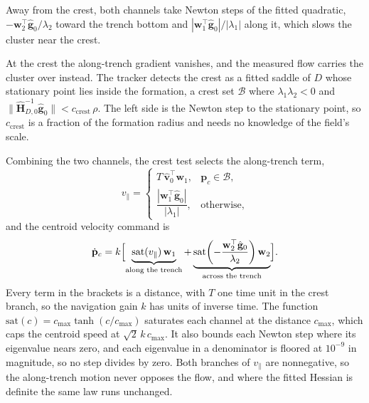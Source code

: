 \documentclass[lettersize,journal]{IEEEtran}
\begin{document}
Away from the crest, both channels take Newton steps of the fitted
quadratic, $-\mathbf{w}_2^\top\hat{\mathbf{g}}_0/\lambda_2$ toward the
trench bottom and $|\mathbf{w}_1^\top\hat{\mathbf{g}}_0|/|\lambda_1|$
along it, which slows the cluster near the crest.

At the crest the along-trench gradient vanishes, and the measured flow
carries the cluster over instead. The tracker detects the crest as a
fitted saddle of $D$ whose stationary point lies inside the formation, a
crest set $\mathcal{B}$ where $\lambda_1\lambda_2 < 0$ and
\mbox{$\|\hat{\mathbf{H}}_{D,0}^{-1}\hat{\mathbf{g}}_0\| < c_{\mathrm{crest}}\,\rho$}.
The left side is the Newton step to the stationary point, so
$c_{\mathrm{crest}}$ is a fraction of the formation radius and needs no
knowledge of the field's scale.

Combining the two channels, the crest test selects the along-trench term,
\begin{equation}
    v_\parallel =
    \begin{cases}
        T\,\hat{\mathbf{v}}_0^\top \mathbf{w}_1,
            & \mathbf{p}_c \in \mathcal{B}, \\[6pt]
        \dfrac{|\mathbf{w}_1^\top \hat{\mathbf{g}}_0|}{|\lambda_1|},
            & \text{otherwise},
    \end{cases}
    \label{eq:vpar}
\end{equation}
and the centroid velocity command is
\begin{equation}
    \dot{\mathbf{p}}_c = k\Bigl[
    \underbrace{\mathrm{sat}(v_\parallel)\,\mathbf{w}_1}_{\text{along the trench}}
    + \underbrace{\mathrm{sat}\!\left(-\frac{\mathbf{w}_2^\top
      \hat{\mathbf{g}}_0}{\lambda_2}\right)\mathbf{w}_2}_{\text{across the trench}}\Bigr].
    \label{eq:d_law}
\end{equation}
Every term in the brackets is a distance, with $T$ one time unit in the
crest branch, so the navigation gain $k$ has units of inverse time. The
function $\mathrm{sat}(c) = c_{\max}\tanh(c/c_{\max})$ saturates each
channel at the distance $c_{\max}$, which caps the centroid speed at
$\sqrt{2}\,k\,c_{\max}$. It also bounds each Newton step where its
eigenvalue nears zero, and each eigenvalue in a denominator is floored at
$10^{-9}$ in magnitude, so no step divides by zero. Both branches of
$v_\parallel$ are nonnegative, so the along-trench motion never opposes
the flow, and where the fitted Hessian is definite the same law runs
unchanged.
\end{document}
